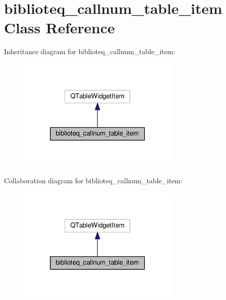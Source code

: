 \hypertarget{classbiblioteq__callnum__table__item}{}\section{biblioteq\+\_\+callnum\+\_\+table\+\_\+item Class Reference}
\label{classbiblioteq__callnum__table__item}


Inheritance diagram for biblioteq\+\_\+callnum\+\_\+table\+\_\+item\+:
\nopagebreak
\begin{figure}[H]
\begin{center}
\leavevmode
\includegraphics[width=222pt]{classbiblioteq__callnum__table__item__inherit__graph}
\end{center}
\end{figure}


Collaboration diagram for biblioteq\+\_\+callnum\+\_\+table\+\_\+item\+:
\nopagebreak
\begin{figure}[H]
\begin{center}
\leavevmode
\includegraphics[width=222pt]{classbiblioteq__callnum__table__item__coll__graph}
\end{center}
\end{figure}
